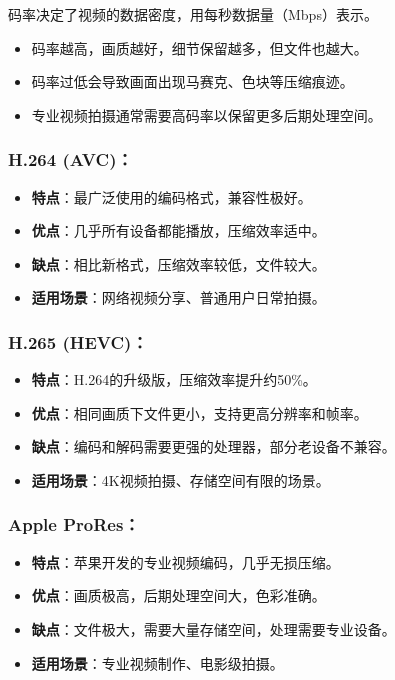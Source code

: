 码率决定了视频的数据密度，用每秒数据量（Mbps）表示。

\begin{itemize}
  \item 码率越高，画质越好，细节保留越多，但文件也越大。
  \item 码率过低会导致画面出现马赛克、色块等压缩痕迹。
  \item 专业视频拍摄通常需要高码率以保留更多后期处理空间。
\end{itemize}


\subsubsection*{H.264 (AVC)：}

\begin{itemize}
  \item \textbf{特点}：最广泛使用的编码格式，兼容性极好。
  \item \textbf{优点}：几乎所有设备都能播放，压缩效率适中。
  \item \textbf{缺点}：相比新格式，压缩效率较低，文件较大。
  \item \textbf{适用场景}：网络视频分享、普通用户日常拍摄。
\end{itemize}

\subsubsection*{H.265 (HEVC)：}

\begin{itemize}
  \item \textbf{特点}：H.264的升级版，压缩效率提升约50\%。
  \item \textbf{优点}：相同画质下文件更小，支持更高分辨率和帧率。
  \item \textbf{缺点}：编码和解码需要更强的处理器，部分老设备不兼容。
  \item \textbf{适用场景}：4K视频拍摄、存储空间有限的场景。
\end{itemize}

\subsubsection*{Apple ProRes：}

\begin{itemize}
  \item \textbf{特点}：苹果开发的专业视频编码，几乎无损压缩。
  \item \textbf{优点}：画质极高，后期处理空间大，色彩准确。
  \item \textbf{缺点}：文件极大，需要大量存储空间，处理需要专业设备。
  \item \textbf{适用场景}：专业视频制作、电影级拍摄。
\end{itemize}

